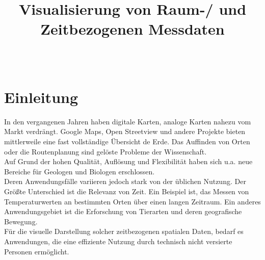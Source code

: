 \documentclass[10pt,conference,compsocconf]{IEEEtran}
\begin{document}
%
\title{\textbf{\Large Visualisierung von Raum-/ und Zeitbezogenen Messdaten}\\[0.2ex]}

\author{
\\
}

\maketitle

\IEEEpeerreviewmaketitle


\section{Einleitung}
In den vergangenen Jahren haben digitale Karten, analoge Karten nahezu vom Markt verdrängt. Google Maps, Open Streetview und andere Projekte bieten mittlerweile eine fast vollständige Übersicht de Erde. Das Auffinden von Orten oder die Routenplanung sind gelöste Probleme der Wissenschaft.\\
Auf Grund der hohen Qualität, Auflösung und Flexibilität haben sich u.a. neue Bereiche für Geologen und Biologen erschlossen.\\
Deren Anwendungsfälle variieren jedoch stark von der üblichen Nutzung. Der Größte Unterschied ist die Relevanz von Zeit. Ein Beispiel ist, das Messen von Temperaturwerten an bestimmten Orten über einen langen Zeitraum. Ein anderes Anwendungsgebiet ist die Erforschung von Tierarten und deren geografische Bewegung.\\
Für die visuelle Darstellung solcher zeitbezogenen spatialen Daten, bedarf es Anwendungen, die eine effiziente Nutzung durch technisch nicht versierte Personen ermöglicht.
\end{document}
